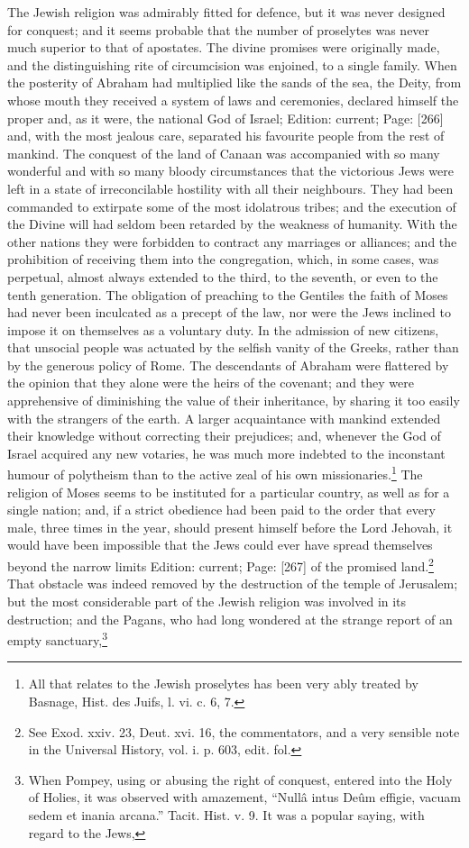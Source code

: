 The Jewish religion was admirably fitted for defence, but it was never designed for conquest; and it seems probable that the number of proselytes was never much superior to that of apostates. The divine promises were originally made, and the distinguishing rite of circumcision was enjoined, to a single family. When the posterity of Abraham had multiplied like the sands of the sea, the Deity, from whose mouth they received a system of laws and ceremonies, declared himself the proper and, as it were, the national God of Israel; Edition: current; Page: [266] and, with the most jealous care, separated his favourite people from the rest of mankind. The conquest of the land of Canaan was accompanied with so many wonderful and with so many bloody circumstances that the victorious Jews were left in a state of irreconcilable hostility with all their neighbours. They had been commanded to extirpate some of the most idolatrous tribes; and the execution of the Divine will had seldom been retarded by the weakness of humanity. With the other nations they were forbidden to contract any marriages or alliances; and the prohibition of receiving them into the congregation, which, in some cases, was perpetual, almost always extended to the third, to the seventh, or even to the tenth generation. The obligation of preaching to the Gentiles the faith of Moses had never been inculcated as a precept of the law, nor were the Jews inclined to impose it on themselves as a voluntary duty. In the admission of new citizens, that unsocial people was actuated by the selfish vanity of the Greeks, rather than by the generous policy of Rome. The descendants of Abraham were flattered by the opinion that they alone were the heirs of the covenant; and they were apprehensive of diminishing the value of their inheritance, by sharing it too easily with the strangers of the earth. A larger acquaintance with mankind extended their knowledge without correcting their prejudices; and, whenever the God of Israel acquired any new votaries, he was much more indebted to the inconstant humour of polytheism than to the active zeal of his own missionaries.\footnote{All that relates to the Jewish proselytes has been very ably treated by Basnage, Hist. des Juifs, l. vi. c. 6, 7.} The religion of Moses seems to be instituted for a particular country, as well as for a single nation; and, if a strict obedience had been paid to the order that every male, three times in the year, should present himself before the Lord Jehovah, it would have been impossible that the Jews could ever have spread themselves beyond the narrow limits Edition: current; Page: [267] of the promised land.\footnote{See Exod. xxiv. 23, Deut. xvi. 16, the commentators, and a very sensible note in the Universal History, vol. i. p. 603, edit. fol.} That obstacle was indeed removed by the destruction of the temple of Jerusalem; but the most considerable part of the Jewish religion was involved in its destruction; and the Pagans, who had long wondered at the strange report of an empty sanctuary,\footnote{When Pompey, using or abusing the right of conquest, entered into the Holy of Holies, it was observed with amazement, \texthebrew{“}Nullâ intus Deûm effigie, vacuam sedem et inania arcana.\texthebrew{}” Tacit. Hist. v. 9. It was a popular saying, with regard to the Jews,

}
